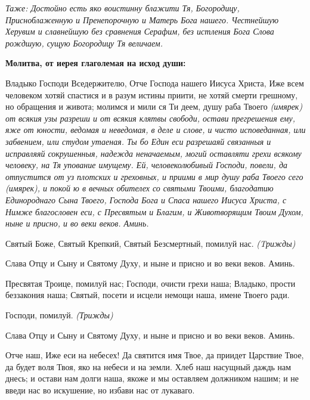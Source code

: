  \itshape Таже:\normalfont{} Достойно есть яко воистинну блажити Тя, Богородицу,
Присноблаженную и Пренепорочную и Матерь Бога нашего. Честнейшую
Херувим и славнейшую без сравнения Серафим, без истления Бога Слова
рождшую, сущую Богородицу Тя величаем.

   


 

\bfseries Молитва, от иерея глаголемая на исход души:\normalfont{}



Владыко Господи Вседержителю, Отче Господа нашего Иисуса Христа, Иже всем человеком хотяй спастися и в разум истины приити, не хотяй смерти грешному, но обращения и живота; молимся и мили ся Ти деем, душу раба Твоего \itshape (имярек)\normalfont{} от всякия узы разреши и от всякия клятвы свободи, остави прегрешения ему, яже от юности, ведомая и неведомая, в деле и слове, и чисто исповеданная, или забвением, или студом утаеная. Ты бо Един еси разрешаяй связанныя и исправляяй сокрушенныя, надежда неначаемым, могий оставляти грехи всякому человеку, на Тя упование имущему. Ей, человеколюбивый Господи, повели, да отпустится от уз плотских и греховных, и приими в мир душу раба Твоего сего \itshape (имярек)\normalfont{}, и покой ю в вечных обителех со святыми Твоими, благодатию Единороднаго Сына Твоего, Господа Бога и Спаса нашего Иисуса Христа, с Нимже благословен еси, с Пресвятым и Благим, и Животворящим Твоим Духом, ныне и присно, и во веки веков. Аминь.


\mychapterending




Святый Боже, Святый Крепкий,
Святый Безсмертный, помилуй нас. \itshape  (Tрижды)\normalfont{}


Слава Отцу и Сыну и Святому Духу, и ныне и присно и во веки веков.
Аминь.


   Пресвятая Троице, помилуй нас; Господи, очисти грехи наша; Владыко,
прости беззакония наша; Святый, посети и исцели немощи наша, имене
Твоего ради.


   Господи, помилуй. \itshape  (Трижды)\normalfont{}


   Слава Отцу и Сыну и Святому Духу, и ныне и присно и во веки веков.
Аминь.


   Отче наш, Иже еси на небесех! Да святится имя Твое, да приидет
Царствие Твое, да будет воля Твоя, яко на небеси и на земли. Хлеб наш
насущный даждь нам днесь; и остави нам долги наша, якоже и мы оставляем
должником нашим; и не введи нас во искушение, но избави нас от
лукаваго.



